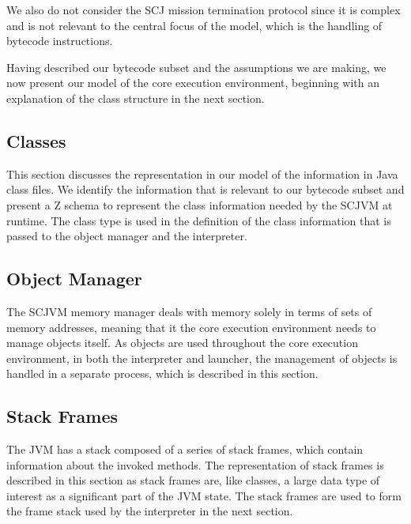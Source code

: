 We also do not consider the SCJ mission termination protocol since it
is complex and is not relevant to the central focus of the model,
which is the handling of bytecode instructions.

Having described our bytecode subset and the assumptions we are
making, we now present our model of the core execution environment,
beginning with an explanation of the class structure in the next
section.

\subsection{Classes}
\label{cee-classes-subsection}

This section discusses the representation in our model of the
information in Java class files.
We identify the information that is relevant to our bytecode subset
and present a Z schema to represent the class information needed by
the SCJVM at runtime.
The class type is used in the definition of the class information that
is passed to the object manager and the interpreter.



\subsection{Object Manager}
\label{cee-memory-subsection}

The SCJVM memory manager deals with memory solely in terms of sets of
memory addresses, meaning that it the core execution environment needs
to manage objects itself.
As objects are used throughout the core execution environment, in both
the interpreter and launcher, the management of objects is handled in
a separate \Circus{} process, which is described in this section.



\subsection{Stack Frames}
\label{cee-stack-frames-subsection}

The JVM has a stack composed of a series of stack frames, which
contain information about the invoked methods.
The representation of stack frames is described in this section as
stack frames are, like classes, a large data type of interest as a
significant part of the JVM state.
The stack frames are used to form the frame stack used by the
interpreter in the next section.

